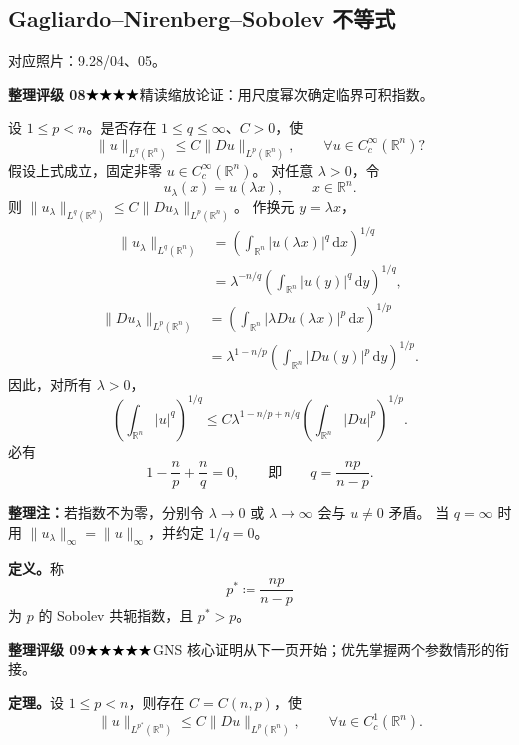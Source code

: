 \documentclass[UTF8,a4paper,11pt,fontset=fandol]{ctexart}
\newcommand{\R}{\mathbb R}
\newcommand{\dd}{\,\mathrm d}
\newcommand{\ednote}[1]{\par{\small\color{notegray}\textbf{整理注：}#1}\par}
\newcommand{\source}[1]{{\small\color{notegray}对应照片：#1。}\par}
\newcommand{\proofstars}[1]{\ensuremath{%
\ifnum#1>0\relax\bigstar\fi
\ifnum#1>1\relax\bigstar\fi
\ifnum#1>2\relax\bigstar\fi
\ifnum#1>3\relax\bigstar\fi
\ifnum#1>4\relax\bigstar\fi}}
\newcommand{\proofrating}[3]{\par{\small\color{proofblue}%
\textbf{整理评级 #1}\enspace\proofstars{#2}\quad #3\par}}
\begin{document}
\subsection{Gagliardo--Nirenberg--Sobolev 不等式}
\source{9.28/04、05}
\proofrating{08}{4}{精读缩放论证：用尺度幂次确定临界可积指数。}
设 $1\leq p<n$。是否存在 $1\leq q\leq\infty$、$C>0$，使
\[
\|u\|_{L^q(\R^n)}\leq C\|Du\|_{L^p(\R^n)},
\qquad\forall u\in C_c^\infty(\R^n)?
\]
假设上式成立，固定非零 $u\in C_c^\infty(\R^n)$。
对任意 $\lambda>0$，令
\[
u_\lambda(x)=u(\lambda x),\qquad x\in\R^n.
\]
则 $\|u_\lambda\|_{L^q(\R^n)}\leq C\|Du_\lambda\|_{L^p(\R^n)}$。
作换元 $y=\lambda x$，
\[
\begin{aligned}
\|u_\lambda\|_{L^q(\R^n)}
&=\left(\int_{\R^n}|u(\lambda x)|^q\dd x\right)^{1/q}\\
&=\lambda^{-n/q}\left(\int_{\R^n}|u(y)|^q\dd y\right)^{1/q},
\end{aligned}
\]
\[
\begin{aligned}
\|Du_\lambda\|_{L^p(\R^n)}
&=\left(\int_{\R^n}|\lambda Du(\lambda x)|^p\dd x\right)^{1/p}\\
&=\lambda^{1-n/p}\left(\int_{\R^n}|Du(y)|^p\dd y\right)^{1/p}.
\end{aligned}
\]
因此，对所有 $\lambda>0$，
\[
\left(\int_{\R^n}|u|^q\right)^{1/q}
\leq C\lambda^{1-n/p+n/q}\left(\int_{\R^n}|Du|^p\right)^{1/p}.
\]
必有
\[
1-\frac np+\frac nq=0,\qquad\text{即}\qquad q=\frac{np}{n-p}.
\]
\ednote{若指数不为零，分别令 $\lambda\to0$ 或 $\lambda\to\infty$ 会与 $u\ne0$ 矛盾。
当 $q=\infty$ 时用 $\|u_\lambda\|_\infty=\|u\|_\infty$，并约定 $1/q=0$。}
\textbf{定义。}称
\[
p^*\coloneqq\frac{np}{n-p}
\]
为 $p$ 的 Sobolev 共轭指数，且 $p^*>p$。
\proofrating{09}{5}{GNS 核心证明从下一页开始；优先掌握两个参数情形的衔接。}
\textbf{定理。}设 $1\leq p<n$，则存在 $C=C(n,p)$，使
\[
\boxed{\|u\|_{L^{p^*}(\R^n)}\leq C\|Du\|_{L^p(\R^n)},
\qquad\forall u\in C_c^1(\R^n).}
\]

\newpage
\end{document}
